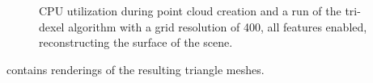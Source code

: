\begin{figure}
	\centering
	\caption{
		CPU utilization during point cloud creation and a run of the tri-dexel algorithm with a grid resolution of 400, all features enabled, reconstructing the surface of the \impeller scene.
	}
	\label{fig:td_hq_impeller_cpu}
\end{figure}

 contains renderings of the resulting triangle meshes.

